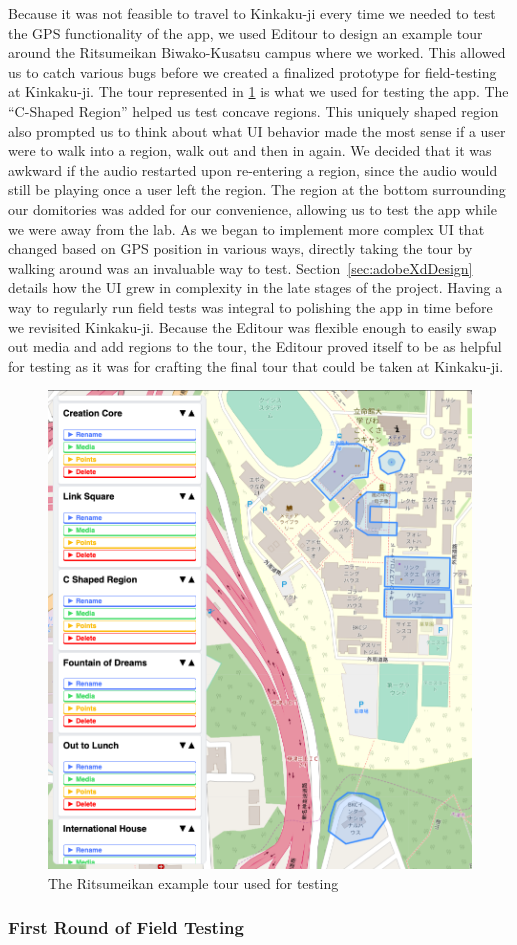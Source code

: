 \documentclass[a4paper, 10pt, american, titlepage]{article}
\begin{document}
Because it was not feasible to travel to Kinkaku-ji every time we needed to
test the GPS functionality of the app, we used Editour to design an example
tour around the Ritsumeikan Biwako-Kusatsu campus where we worked. This allowed
us to catch various bugs before we created a finalized prototype for
field-testing at Kinkaku-ji. The tour represented in \ref{fig:ritsuTour} is
what we used for testing the app. The ``C-Shaped Region'' helped us test
concave regions. This uniquely shaped region also prompted us to think about
what UI behavior made the most sense if a user were to walk into a region, walk
out and then in again. We decided that it was awkward if the audio restarted
upon re-entering a region, since the audio would still be playing once a user
left the region. The region at the bottom surrounding our domitories was added
for our convenience, allowing us to test the app while we were away from the
lab.  As we began to implement more complex UI that changed based on GPS
position in various ways, directly taking the tour by walking around was an
invaluable way to test. Section~\ref{sec:adobeXdDesign} details how the UI grew
in complexity in the late stages of the project. Having a way to regularly run
field tests was integral to polishing the app in time before we revisited
Kinkaku-ji.  Because the Editour was flexible enough to easily swap out media
and add regions to the tour, the Editour proved itself to be as helpful for
testing as it was for crafting the final tour that could be taken at
Kinkaku-ji.

\begin{figure}[h]
	\centering
	\includegraphics[width=.5\textwidth]{ritsu-tour.png}
	\caption{The Ritsumeikan example tour used for testing}
	\label{fig:ritsuTour}
\end{figure}

\subsubsection{First Round of Field Testing}
\label{sec:firstRoundOfFieldTesting}
\end{document}
